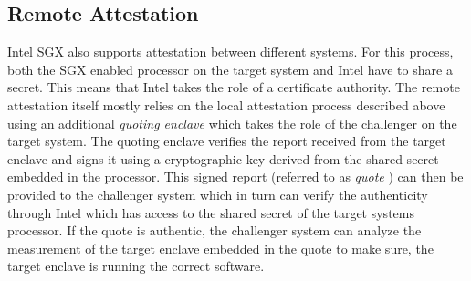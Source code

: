 \subsection{Remote Attestation}
Intel SGX also supports attestation between different systems. For this process, both the SGX enabled processor on the target system and Intel have to share a secret. This
means that Intel takes the role of a certificate authority. The remote attestation itself mostly relies on the local attestation process described above using an additional 
\textit{quoting enclave} which takes the role of the challenger on the target system. The quoting enclave verifies the report received from the target enclave and signs it using 
a cryptographic key derived from the shared secret embedded in the processor. This signed report (referred to as \textit{quote} \cite{EnclaveWritersGuide}) can then be provided 
to the challenger system which in turn can verify the authenticity through Intel which has access to the shared secret of the target systems processor. If the quote is authentic, 
the challenger system can analyze the measurement of the target enclave embedded in the quote to make sure, the target enclave is running the correct software.
